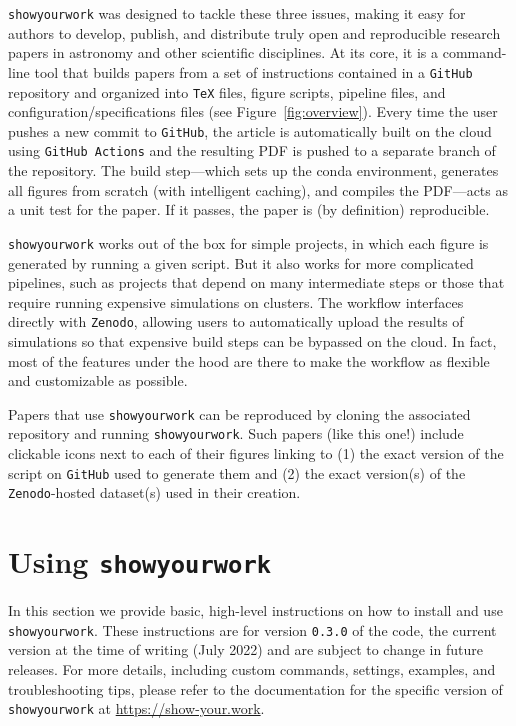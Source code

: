 \documentclass[modern]{aastex631}
\newcommand\syw{\texttt{showyourwork}\xspace}
\begin{document}
\syw was designed to tackle these three issues, making it easy for authors to develop, publish, and distribute truly open and reproducible research papers in astronomy and other scientific disciplines. 
At its core, it is a command-line tool that builds papers from a set of instructions contained in a \texttt{GitHub} repository and organized into \texttt{TeX} files, figure scripts, pipeline files, and configuration/specifications files (see Figure~\ref{fig:overview}).
Every time the user pushes a new commit to \texttt{GitHub}, the article is automatically built on the cloud using \texttt{GitHub Actions} and the resulting PDF is pushed to a separate branch of the repository. 
The build step---which sets up the conda environment, generates all figures from scratch (with intelligent caching), and compiles the PDF---acts as a unit test for the paper. 
If it passes, the paper is (by definition) reproducible.

\syw works out of the box for simple projects, in which each figure is generated by running a given script. 
But it also works for more complicated pipelines, such as projects that depend on many intermediate steps or those that require running expensive simulations on clusters. 
The workflow interfaces directly with \texttt{Zenodo}, allowing users to automatically upload the results of simulations so that expensive build steps can be bypassed on the cloud. 
In fact, most of the features under the hood are there to make the workflow as flexible and customizable as possible.

Papers that use \syw can be reproduced by cloning the associated repository and running \syw. 
Such papers (like this one!) include clickable icons next to each of their figures linking to (1) the exact version of the script on \texttt{GitHub} used to generate them and (2) the exact version(s) of the \texttt{Zenodo}-hosted dataset(s) used in their creation.

\section{Using {\protect\syw}}
\label{sec:usage}
In this section we provide basic, high-level instructions on how to install and use \syw.
These instructions are for version \texttt{0.3.0} of the code, the current version at the time of writing (July 2022) and are subject to change in future releases.
For more details, including custom commands, settings, examples, and troubleshooting tips, please refer to the documentation for the specific version of \syw at \url{https://show-your.work}.
\end{document}
